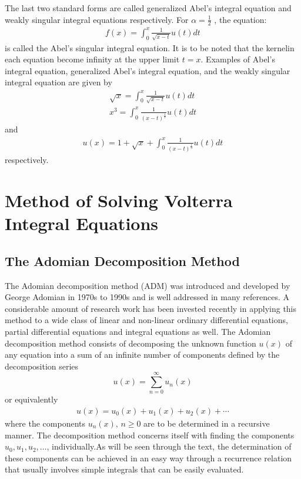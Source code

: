 \documentclass[11pt]{report}
\newcommand{\sps}{\\[0.2cm]}
\newcommand{\NI}{\noindent}
\begin{document}
	\NI The last two standard forms are called generalized Abel’s integral equation and weakly singular integral equations respectively. For $\alpha = \frac{1}{2}$ , the equation:
	\begin{eqnarray}
		f(x) =\int_{0}^{x} \frac{1}{\sqrt{x - t}} u(t)dt
	\end{eqnarray}
	is called the Abel’s singular integral equation. It is to be noted that the kernelin each equation become infinity at the upper limit $t = x$. Examples of Abel’s integral equation, generalized Abel’s integral equation, and the weakly singular integral equation are given by
	\begin{gather}
		\sqrt{x} =\int_{0}^{x} \frac{1}{\sqrt{x - t}} u(t)dt\sps
		x^3 = \int_{0}^{x} \frac{1}{(x - t)^\frac{1}{3}} u(t)dt
	\end{gather}		
	and
	\begin{eqnarray}
		u(x) = 1 + \sqrt{x} +\int_{0}^{x} \frac{1}{(x - t)^\frac{1}{3}} u(t)dt
	\end{eqnarray}
	respectively.

	\section{Method of Solving Volterra Integral Equations}
	\subsection{The Adomian Decomposition Method}
	The Adomian decomposition method (ADM) was introduced and developed by George Adomian in 1970s to 1990s and is well addressed in many references. A considerable amount of research work has been invested recently in applying this method to a wide class of linear and non-linear ordinary differential equations, partial differential equations and integral equations as well. The Adomian decomposition method consists of decomposing the unknown function $u(x)$ of any equation into a sum of an infinite number of components defined by the decomposition series
	\begin{equation}
		u(x) = \sum_{n=0}^{\infty}  u_n(x)\label{eq:2_13}
	\end{equation}
	or equivalently
	\begin{eqnarray}
		u(x) = u_0(x) + u_1(x) + u_2(x) + \cdots \label{eq:2_14}
	\end{eqnarray}
	where the components $u_n(x)$, $n\geq 0$ are to be determined  in a recursive manner. The decomposition method concerns itself with finding the components $u_0, u_1, u_2,\ldots$,  individually.As will be seen through the text, the determination of these components can be achieved in an easy way through a recurrence relation that usually involves simple integrals that can be easily evaluated.\\
	
\end{document}
